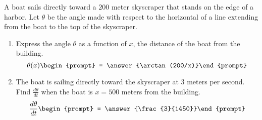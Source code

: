 \documentclass{ximera}
\author{Gregory Hartman \and Matthew Carr}
\begin{document}
\begin{exercise}



A boat sails directly toward a $200$ meter skyscraper that stands on the edge of a harbor. Let $\theta$ be the angle made with respect to the horizontal of a line extending from the boat to the top of the skyscraper.
\begin{enumerate}
\item		Express the angle $\theta$ as a function of $x$, the distance of the boat from the building. \[\theta(x)\begin{prompt} = \answer{\arctan(200/x)}\end{prompt}\]
\item		The boat is sailing directly toward the skyscraper at $3$ meters per second. Find $\frac{d\theta}{dt}$ when the boat is $x=500$ meters from the building. \[\frac{d\theta}{dt}\begin{prompt} = \answer{\frac{3}{1450}}\end{prompt}\]
\end{enumerate}

\end{exercise}
\end{document}
